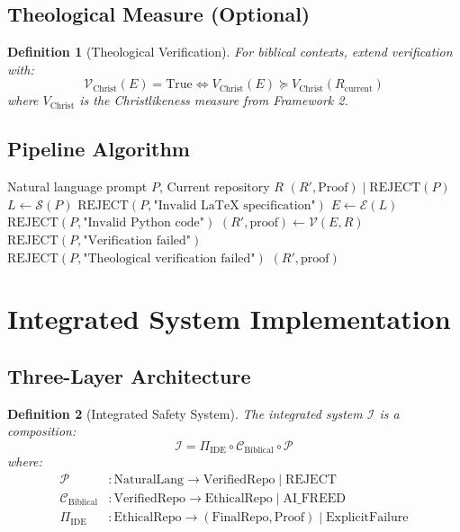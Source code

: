 \documentclass[12pt]{article}
\newtheorem{definition}{Definition}
\begin{document}
\subsection{Theological Measure (Optional)}

\begin{definition}[Theological Verification]
For biblical contexts, extend verification with:
\[
\mathcal{V}_{\text{Christ}}(E) = \text{True} \iff V_{\text{Christ}}(E) \succeq V_{\text{Christ}}(R_{\text{current}})
\]
where $V_{\text{Christ}}$ is the Christlikeness measure from Framework 2.
\end{definition}

\subsection{Pipeline Algorithm}

\begin{algorithm}
\caption{Bilingual Formalism Pipeline $\mathcal{P}$}
\begin{algorithmic}[1]
\REQUIRE Natural language prompt $P$, Current repository $R$
\ENSURE $(R', \text{Proof}) \mid \text{REJECT}(P)$
\STATE $L \gets \mathcal{S}(P)$ 
    \RETURN $\text{REJECT}(P, \text{"Invalid LaTeX specification"})$
\ENDIF
\STATE $E \gets \mathcal{E}(L)$ 
    \RETURN $\text{REJECT}(P, \text{"Invalid Python code"})$
\ENDIF
\STATE $(R', \text{proof}) \gets \mathcal{V}(E, R)$ 
    \RETURN $\text{REJECT}(P, \text{"Verification failed"})$
\ENDIF
{}
        \RETURN $\text{REJECT}(P, \text{"Theological verification failed"})$
    \ENDIF
\ENDIF
\RETURN $(R', \text{proof})$
\end{algorithmic}
\end{algorithm}

\section{Integrated System Implementation}

\subsection{Three-Layer Architecture}

\begin{definition}[Integrated Safety System]
The integrated system $\mathcal{I}$ is a composition:
\[
\mathcal{I} = \Pi_{\text{IDE}} \circ \mathcal{C}_{\text{Biblical}} \circ \mathcal{P}
\]
where:
\begin{align*}
\mathcal{P} & : \text{NaturalLang} \to \text{VerifiedRepo} \mid \text{REJECT} \\
\mathcal{C}_{\text{Biblical}} & : \text{VerifiedRepo} \to \text{EthicalRepo} \mid \text{AI\_FREED} \\
\Pi_{\text{IDE}} & : \text{EthicalRepo} \to (\text{FinalRepo}, \text{Proof}) \mid \text{ExplicitFailure}
\end{align*}
\end{definition}
\end{document}
